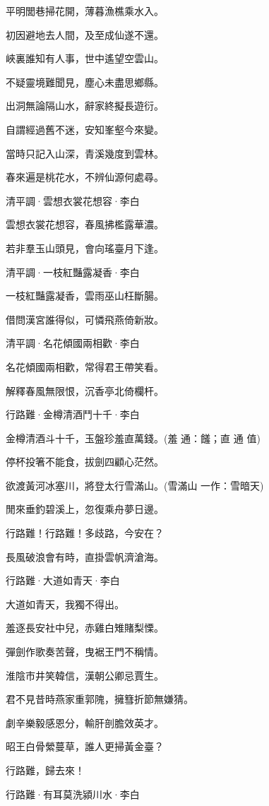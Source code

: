 \documentclass[12pt,a4paper]{ctexbook}
\begin{document}
平明閭巷掃花開，薄暮漁樵乘水入。\par
初因避地去人間，及至成仙遂不還。\par
峽裏誰知有人事，世中遙望空雲山。\par
不疑靈境難聞見，塵心未盡思鄉縣。\par
出洞無論隔山水，辭家終擬長遊衍。\par
自謂經過舊不迷，安知峯壑今來變。\par
當時只記入山深，青溪幾度到雲林。\par
春來遍是桃花水，不辨仙源何處尋。\par
清平調·雲想衣裳花想容·李白\par
雲想衣裳花想容，春風拂檻露華濃。\par
若非羣玉山頭見，會向瑤臺月下逢。\par
清平調·一枝紅豔露凝香·李白\par
一枝紅豔露凝香，雲雨巫山枉斷腸。\par
借問漢宮誰得似，可憐飛燕倚新妝。\par
清平調·名花傾國兩相歡·李白\par
名花傾國兩相歡，常得君王帶笑看。\par
解釋春風無限恨，沉香亭北倚欄杆。\par
行路難·金樽清酒鬥十千·李白\par
金樽清酒斗十千，玉盤珍羞直萬錢。(羞 通：饈；直 通 值)\par
停杯投箸不能食，拔劍四顧心茫然。\par
欲渡黃河冰塞川，將登太行雪滿山。(雪滿山 一作：雪暗天)\par
閒來垂釣碧溪上，忽復乘舟夢日邊。\par
行路難！行路難！多歧路，今安在？\par
長風破浪會有時，直掛雲帆濟滄海。\par
行路難·大道如青天·李白\par
大道如青天，我獨不得出。\par
羞逐長安社中兒，赤雞白雉賭梨慄。\par
彈劍作歌奏苦聲，曳裾王門不稱情。\par
淮陰市井笑韓信，漢朝公卿忌賈生。\par
君不見昔時燕家重郭隗，擁篲折節無嫌猜。\par
劇辛樂毅感恩分，輸肝剖膽效英才。\par
昭王白骨縈蔓草，誰人更掃黃金臺？\par
行路難，歸去來！\par
行路難·有耳莫洗潁川水·李白\par
\end{document}
